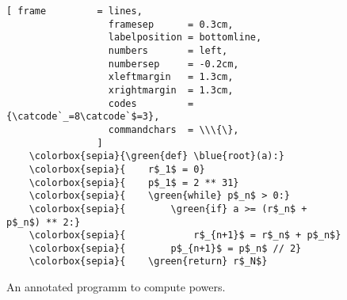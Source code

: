 \begin{figure}[!h]
\centering
\begin{Verbatim}[ frame         = lines, 
                  framesep      = 0.3cm, 
                  labelposition = bottomline,
                  numbers       = left,
                  numbersep     = -0.2cm,
                  xleftmargin   = 1.3cm,
                  xrightmargin  = 1.3cm,
                  codes         = {\catcode`_=8\catcode`$=3},
                  commandchars  = \\\{\},
                ]
    \colorbox{sepia}{\green{def} \blue{root}(a):}
    \colorbox{sepia}{    r$_1$ = 0}
    \colorbox{sepia}{    p$_1$ = 2 ** 31}
    \colorbox{sepia}{    \green{while} p$_n$ > 0:}
    \colorbox{sepia}{        \green{if} a >= (r$_n$ + p$_n$) ** 2:}
    \colorbox{sepia}{            r$_{n+1}$ = r$_n$ + p$_n$}
    \colorbox{sepia}{        p$_{n+1}$ = p$_n$ // 2}
    \colorbox{sepia}{    \green{return} r$_N$}
\end{Verbatim}
\vspace*{-0.3cm}
\caption{An annotated programm to compute powers.}
\label{fig:Integer-Square-Root-Iterative.ipynb}
\end{figure} %

